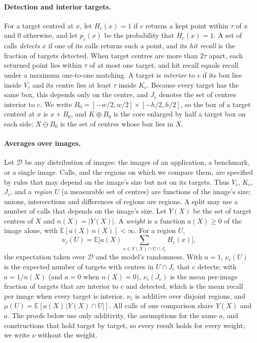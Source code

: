 \paragraph{Detection and interior targets.} For a target centred at $x$, let $H_c(x) = 1$ if $c$ returns a kept point within $\tau$ of $x$ and $0$ otherwise, and let $p_c(x)$ be the probability that $H_c(x) = 1$. A set of calls \emph{detects} $x$ if one of its calls returns such a point, and its \emph{hit recall} is the fraction of targets detected. When target centres are more than $2\tau$ apart, each returned point lies within $\tau$ of at most one target, and hit recall equals recall under a maximum one-to-one matching. A target is \emph{interior} to $c$ if its box lies inside $V_c$ and its centre lies at least $\tau$ inside $K_c$. Because every target has the same box, this depends only on the centre, and $J_c$ denotes the set of centres interior to $c$. We write $B_0 = [-w/2, w/2] \times [-h/2, h/2]$, so the box of a target centred at $x$ is $x + B_0$, and $K \oplus B_0$ is the core enlarged by half a target box on each side; $X \ominus B_0$ is the set of centres whose box lies in $X$.

\paragraph{Averages over images.} Let $\mathcal{D}$ be any distribution of images: the images of an application, a benchmark, or a single image. Calls, and the regions on which we compare them, are specified by rules that may depend on the image's size but not on its targets. Thus $V_c$, $K_c$, $J_c$, and a \emph{region} $U$ (a measurable set of centres) are functions of the image's size; unions, intersections and differences of regions are regions. A split may use a number of calls that depends on the image's size. Let $Y(X)$ be the set of target centres of $X$ and $n(X) = |Y(X)|$. A \emph{weight} is a function $a(X) \ge 0$ of the image alone, with $\mathbb{E}[a(X)\,n(X)] < \infty$. For a region $U$,
\[
\nu_c(U) = \mathbb{E}\Big[a(X) \sum_{x \in Y(X) \cap U \cap J_c} H_c(x)\Big],
\]
the expectation taken over $\mathcal{D}$ and the model's randomness. With $a = 1$, $\nu_c(U)$ is the expected number of targets with centres in $U \cap J_c$ that $c$ detects; with $a = 1/n(X)$ (and $a = 0$ when $n(X) = 0$), $\nu_c(J_c)$ is the mean per-image fraction of targets that are interior to $c$ and detected, which is the mean recall per image when every target is interior. $\nu_c$ is additive over disjoint regions, and $\mu(U) = \mathbb{E}[a(X)\,|Y(X) \cap U|]$. All calls of one comparison share $Y(X)$ and $a$. The proofs below use only additivity, the assumptions for the same $a$, and constructions that hold target by target, so every result holds for every weight; we write $\nu$ without the weight.

